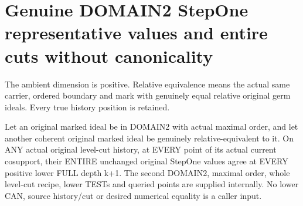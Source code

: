 \section{Genuine DOMAIN2 StepOne representative values and entire cuts without canonicality}

The ambient dimension is positive. Relative equivalence means the actual
same carrier, ordered boundary and mark with genuinely equal relative
original germ ideals. Every true history position is retained.

\begin{theorem}
\label{hir:original-bound-two-stepone-representative-values}
\leanok
Let an original marked ideal be in DOMAIN2 with actual maximal order, and
let another coherent original marked ideal be genuinely relative-equivalent
to it. On ANY actual original level-cut history, at EVERY point of its
actual current cosupport, their ENTIRE unchanged original StepOne values
agree at EVERY positive lower FULL depth k+1. The second DOMAIN2, maximal
order, whole level-cut recipe, lower TESTs and queried points are supplied
internally. No lower CAN, source history/cut or desired numerical equality
is a caller input.
\end{theorem}
